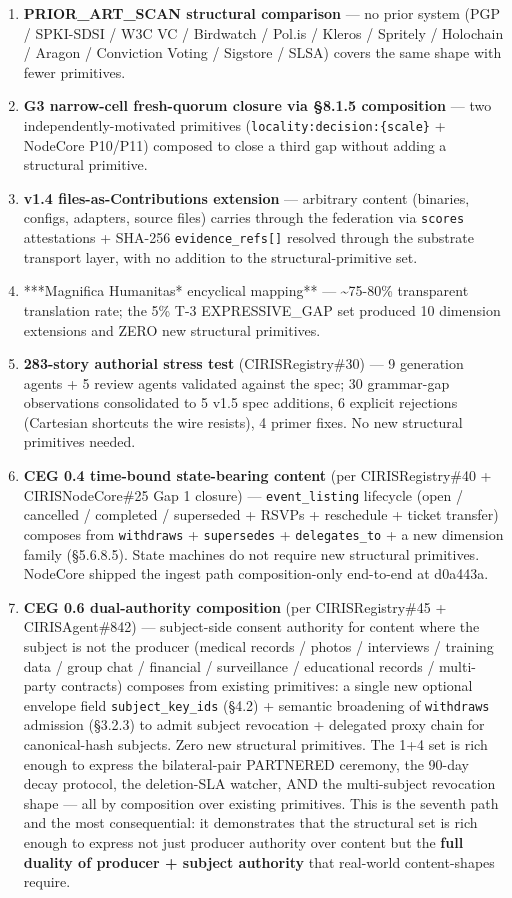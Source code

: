 \documentclass[10pt]{article}
\begin{document}
\begin{enumerate}\setlength\itemsep{0pt}
\item \textbf{PRIOR\_ART\_SCAN structural comparison} — no prior system (PGP / SPKI-SDSI / W3C VC / Birdwatch / Pol.is / Kleros / Spritely / Holochain / Aragon / Conviction Voting / Sigstore / SLSA) covers the same shape with fewer primitives.
\item \textbf{G3 narrow-cell fresh-quorum closure via §8.1.5 composition} — two independently-motivated primitives (\texttt{locality:decision:\{scale\}} + NodeCore P10/P11) composed to close a third gap without adding a structural primitive.
\item \textbf{v1.4 files-as-Contributions extension} — arbitrary content (binaries, configs, adapters, source files) carries through the federation via \texttt{scores} attestations + SHA-256 \texttt{evidence\_refs[]} resolved through the substrate transport layer, with no addition to the structural-primitive set.
\item ***Magnifica Humanitas* encyclical mapping** — \textasciitilde{}75-80\% transparent translation rate; the 5\% T-3 EXPRESSIVE\_GAP set produced 10 dimension extensions and ZERO new structural primitives.
\item \textbf{283-story authorial stress test} (CIRISRegistry\#30) — 9 generation agents + 5 review agents validated against the spec; 30 grammar-gap observations consolidated to 5 v1.5 spec additions, 6 explicit rejections (Cartesian shortcuts the wire resists), 4 primer fixes. No new structural primitives needed.
\item \textbf{CEG 0.4 time-bound state-bearing content} (per CIRISRegistry\#40 + CIRISNodeCore\#25 Gap 1 closure) — \texttt{event\_listing} lifecycle (open / cancelled / completed / superseded + RSVPs + reschedule + ticket transfer) composes from \texttt{withdraws} + \texttt{supersedes} + \texttt{delegates\_to} + a new dimension family (§5.6.8.5). State machines do not require new structural primitives. NodeCore shipped the ingest path composition-only end-to-end at d0a443a.
\item \textbf{CEG 0.6 dual-authority composition} (per CIRISRegistry\#45 + CIRISAgent\#842) — subject-side consent authority for content where the subject is not the producer (medical records / photos / interviews / training data / group chat / financial / surveillance / educational records / multi-party contracts) composes from existing primitives: a single new optional envelope field \texttt{subject\_key\_ids} (§4.2) + semantic broadening of \texttt{withdraws} admission (§3.2.3) to admit subject revocation + delegated proxy chain for canonical-hash subjects. Zero new structural primitives. The 1+4 set is rich enough to express the bilateral-pair PARTNERED ceremony, the 90-day decay protocol, the deletion-SLA watcher, AND the multi-subject revocation shape — all by composition over existing primitives. This is the seventh path and the most consequential: it demonstrates that the structural set is rich enough to express not just producer authority over content but the \textbf{full duality of producer + subject authority} that real-world content-shapes require.

\end{enumerate}
\end{document}
